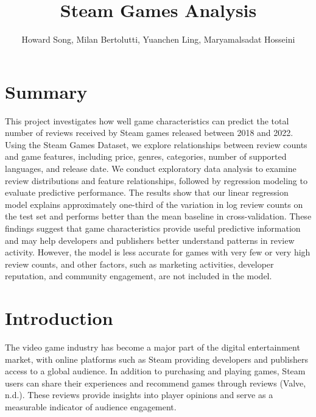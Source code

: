\documentclass[
  letterpaper,
  DIV=11,
  numbers=noendperiod]{scrartcl}
\title{Steam Games Analysis}
\author{Howard Song, Milan Bertolutti, Yuanchen Ling, Maryamalsadat
Hosseini}
\date{}
\begin{document}
\maketitle


\section{Summary}\label{summary}

This project investigates how well game characteristics can predict the
total number of reviews received by Steam games released between 2018
and 2022. Using the Steam Games Dataset, we explore relationships
between review counts and game features, including price, genres,
categories, number of supported languages, and release date. We conduct
exploratory data analysis to examine review distributions and feature
relationships, followed by regression modeling to evaluate predictive
performance. The results show that our linear regression model explains
approximately one-third of the variation in log review counts on the
test set and performs better than the mean baseline in cross-validation.
These findings suggest that game characteristics provide useful
predictive information and may help developers and publishers better
understand patterns in review activity. However, the model is less
accurate for games with very few or very high review counts, and other
factors, such as marketing activities, developer reputation, and
community engagement, are not included in the model.

\section{Introduction}\label{introduction}

The video game industry has become a major part of the digital
entertainment market, with online platforms such as Steam providing
developers and publishers access to a global audience. In addition to
purchasing and playing games, Steam users can share their experiences
and recommend games through reviews (Valve, n.d.). These reviews provide
insights into player opinions and serve as a measurable indicator of
audience engagement.
\end{document}
